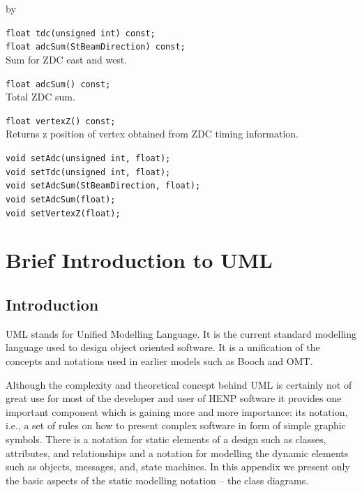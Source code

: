 \documentclass[twoside]{article}
\newcommand{\entrylabel}[1]{\mbox{\textbf{{#1}}}\hfil}%
\newenvironment{entry}
{\begin{list}{}%
    {\renewcommand{\makelabel}{\entrylabel}%
     \setlength{\labelwidth}{90pt}%
     \setlength{\leftmargin}{\labelwidth}
     \advance\leftmargin by \labelsep%
      }%
    }%
  {\end{list}}
\newcommand{\Entrylabel}[1]%
{\raisebox{0pt}[1ex][0pt]{\makebox[\labelwidth][l]%
    {\parbox[t]{\labelwidth}{\hspace{0pt}\textbf{{#1}}}}}}
\newenvironment{Entry}%
{\renewcommand{\entrylabel}{\Entrylabel}\begin{entry}}%
  {\end{entry}}
\begin{document}
\begin{Entry}
    \verb+float tdc(unsigned int) const;+\\

    \verb+float adcSum(StBeamDirection) const;+\\
    Sum for ZDC east and west.
    
    \verb+float adcSum() const;+\\
    Total ZDC sum.

    \verb+float vertexZ() const;+\\
    Returns z position of vertex obtained from ZDC timing information.
    
    \verb+void setAdc(unsigned int, float);+\\
    \verb+void setTdc(unsigned int, float);+\\
    \verb+void setAdcSum(StBeamDirection, float);+\\
    \verb+void setAdcSum(float);+\\
    \verb+void setVertexZ(float);+\\
\end{Entry}
\clearpage


%
%
\appendix
\section{Brief Introduction to UML}
\label{sec:introUML}

\subsection{Introduction}
UML stands for Unified Modelling Language. It is the current standard
modelling language used to design object oriented software. It is a
unification of the concepts and notations used in earlier models such
as Booch and OMT.

Although the complexity and theoretical concept behind UML is
certainly not of great use for most of the developer and user of HENP
software it provides one important component which is gaining more and
more importance: its notation, i.e., a set of rules on how to present
complex software in form of simple graphic symbols.  There is a
notation for static elements of a design such as classes, attributes,
and relationships and a notation for modelling the dynamic elements
such as objects, messages, and, state machines. In this appendix we
present only the basic aspects of the static modelling notation -- the
class diagrams.   
\end{document}
